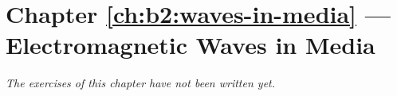\section*{Chapter \ref{ch:b2:waves-in-media} --- Electromagnetic Waves in Media}


\emph{The exercises of this chapter have not been written yet.}

